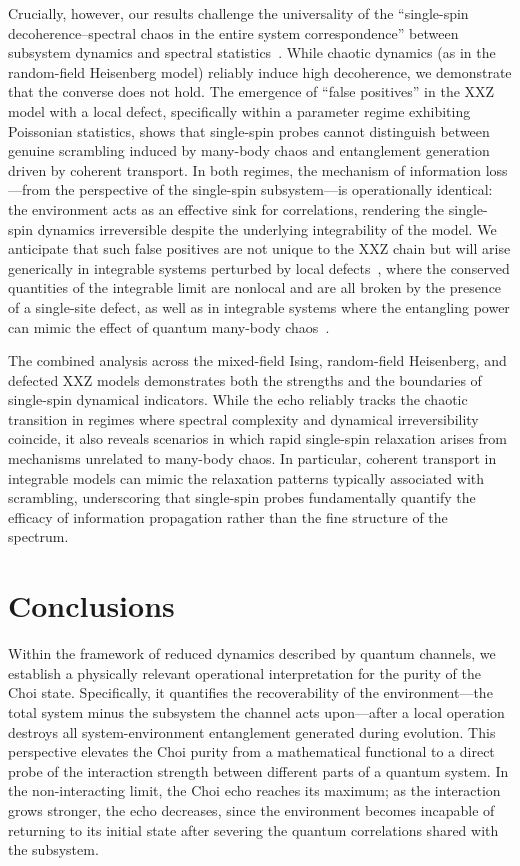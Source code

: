 \documentclass[pra,twocolumn,aps,showpacs,superscriptaddress,longbibliography]{revtex4-2}%
\begin{document}
Crucially, however, our results challenge the universality of the ``single-spin decoherence--spectral chaos in the entire system correspondence'' between subsystem dynamics and spectral statistics~\cite{mirkin_2021_quantum}. While chaotic dynamics (as in the random-field Heisenberg model) reliably induce high decoherence, we demonstrate that the converse does not hold. The emergence of ``false positives'' in the XXZ model with a local defect, specifically within a parameter regime exhibiting Poissonian statistics, shows that single-spin probes cannot distinguish between genuine scrambling induced by many-body chaos and entanglement generation driven by coherent transport. In both regimes, the mechanism of information loss---from the perspective of the single-spin subsystem---is operationally identical: the environment acts as an effective sink for correlations, rendering the single-spin dynamics irreversible despite the underlying integrability of the model. We anticipate that such false positives are not unique to the XXZ chain but will arise generically in integrable systems perturbed by local defects~\cite{santos_2020_speck}, where the conserved quantities of the integrable limit are nonlocal and are all broken by the presence of a single-site defect, as well as in integrable systems where the entangling power can mimic the effect of quantum many-body chaos~\cite{betheanzatsmagic2025}.

The combined analysis across the mixed-field Ising, random-field Heisenberg, and defected XXZ models demonstrates both the strengths and the boundaries of single-spin dynamical indicators. While the echo reliably tracks the chaotic transition in regimes where spectral complexity and dynamical irreversibility coincide, it also reveals scenarios in which rapid single-spin relaxation arises from mechanisms unrelated to many-body chaos. In particular, coherent transport in integrable models can mimic the relaxation patterns typically associated with scrambling, underscoring that single-spin probes fundamentally quantify the efficacy of information propagation rather than the fine structure of the spectrum.

\section{Conclusions}\label{sec:conclusions}
Within the framework of reduced dynamics described by quantum channels, we establish a physically relevant operational interpretation for the purity of the Choi state. Specifically, it quantifies the recoverability of the environment---the total system minus the subsystem the channel acts upon---after a local operation destroys all system-environment entanglement generated during evolution. This perspective elevates the Choi purity from a mathematical functional to a direct probe of the interaction strength between different parts of a quantum system. In the non-interacting limit, the Choi echo reaches its maximum; as the interaction grows stronger, the echo decreases, since the environment becomes incapable of returning to its initial state after severing the quantum correlations shared with the subsystem.
\end{document}
